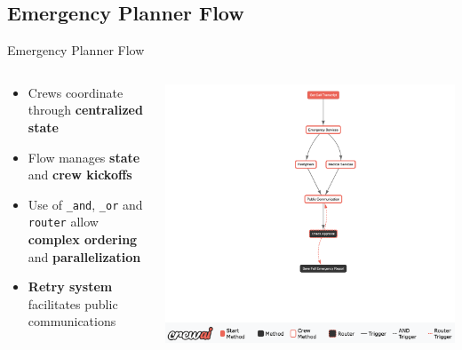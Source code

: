 \subsection{Emergency Planner Flow}
\begin{frame}{Emergency Planner Flow}
    \begin{columns}
        \begin{column}{0.45\textwidth}
            \begin{itemize}
                \item Crews coordinate through \textbf{centralized state}
                \item Flow manages \textbf{state} and \textbf{crew kickoffs}
                \item Use of \texttt{\_and}, \texttt{\_or} and \texttt{router} allow \textbf{complex ordering} and \textbf{parallelization}
                \item \textbf{Retry system} facilitates public communications
            \end{itemize}
        \end{column}
        \begin{column}{0.55\textwidth}
            \includegraphics[width=\textwidth]{../figures/coordination_flow.png}
        \end{column}
    \end{columns}
\end{frame}

